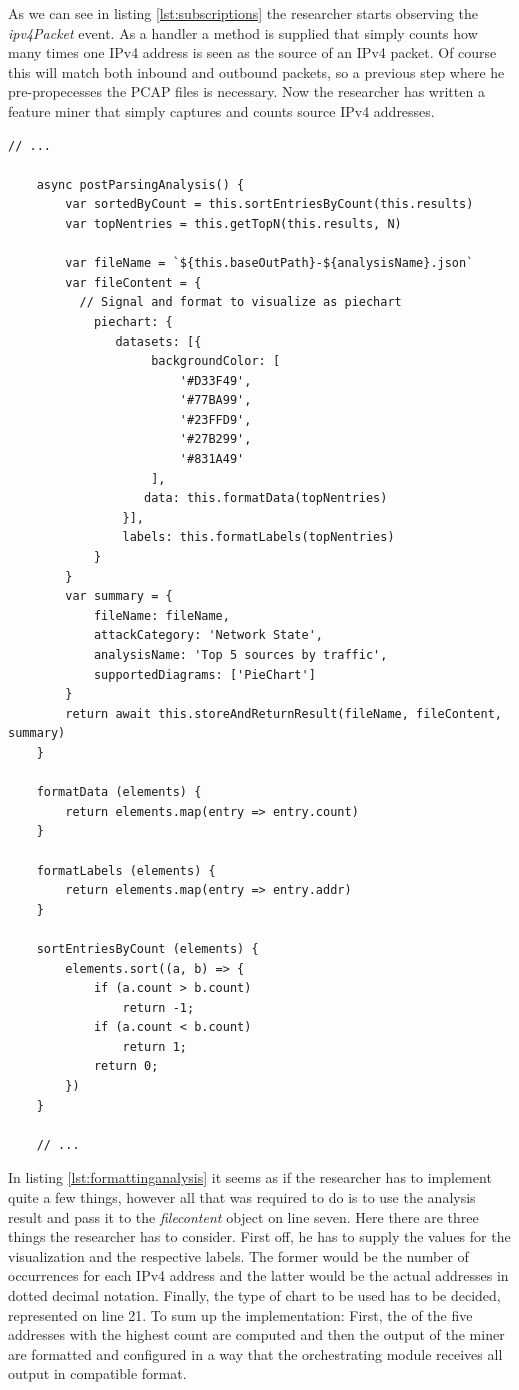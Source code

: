 As we can see in listing \ref{lst:subscriptions} the researcher starts observing the \textit{ipv4Packet} event. As a handler a method is supplied that simply counts how many times one IPv4 address is seen as the source of an IPv4 packet. Of course this will match both inbound and outbound packets, so a previous step where he pre-propecesses the PCAP files is necessary. Now the researcher has written a feature miner that simply captures and counts source IPv4 addresses.

\begin{lstlisting}[caption={Initial content of the newly create Miner},label={lst:formattinganalysis}]
    // ...
    
    async postParsingAnalysis() {
        var sortedByCount = this.sortEntriesByCount(this.results)
        var topNentries = this.getTopN(this.results, N)
 
        var fileName = `${this.baseOutPath}-${analysisName}.json`
        var fileContent = {
          // Signal and format to visualize as piechart
            piechart: {
               datasets: [{
                    backgroundColor: [
                        '#D33F49',
                        '#77BA99',
                        '#23FFD9',
                        '#27B299',
                        '#831A49'
                    ],
                   data: this.formatData(topNentries)
                }],
                labels: this.formatLabels(topNentries)
            }
        }
        var summary = {
            fileName: fileName,
            attackCategory: 'Network State',
            analysisName: 'Top 5 sources by traffic',
            supportedDiagrams: ['PieChart']
        }
        return await this.storeAndReturnResult(fileName, fileContent, summary)
    }
 
    formatData (elements) {
        return elements.map(entry => entry.count)
    }
 
    formatLabels (elements) {
        return elements.map(entry => entry.addr)
    }
  
    sortEntriesByCount (elements) {
        elements.sort((a, b) => {
            if (a.count > b.count)
                return -1;
            if (a.count < b.count)
                return 1;
            return 0;
        })
    }
    
    // ...

\end{lstlisting}
In listing \ref{lst:formattinganalysis} it seems as if the researcher has to implement quite a few things, however all that was required to do is to use the analysis result and pass it to the \textit{filecontent} object on line seven. Here there are three things the researcher has to consider. First off, he has to supply the values for the visualization and the respective labels. The former would be the number of occurrences for each IPv4 address and the latter would be the actual addresses in dotted decimal notation. Finally, the type of chart to be used has to be decided, represented on line 21. To sum up the implementation: First, the of the five addresses with the highest count are computed and then the output of the miner are formatted and configured in a way that the orchestrating module receives all output in compatible format.
